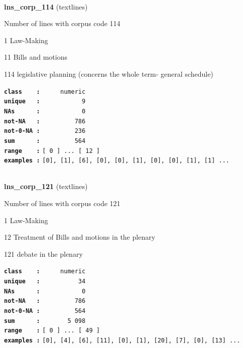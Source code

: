 \documentclass[]{article}
\begin{document}
~

\textbf{lns\_corp\_114} (textlines)

Number of lines with corpus code 114

1 Law-Making

11 Bills and motions

114 legislative planning (concerns the whole term- general schedule)

\textbf{\texttt{class\ \ \ \ :}} \texttt{~~~~~numeric}\\
\textbf{\texttt{unique\ \ \ :}} \texttt{~~~~~~~~~~~9}\\
\textbf{\texttt{NAs\ \ \ \ \ \ :}} \texttt{~~~~~~~~~~~0}\\
\textbf{\texttt{not-NA\ \ \ :}} \texttt{~~~~~~~~~786}\\
\textbf{\texttt{not-0-NA\ :}} \texttt{~~~~~~~~~236}\\
\textbf{\texttt{sum\ \ \ \ \ \ :}} \texttt{~~~~~~~~~564}\\
\textbf{\texttt{range\ \ \ \ :}}
\texttt{{[}\ 0\ {]}\ ...\ {[}\ 12\ {]}}\\
\textbf{\texttt{examples\ :}}
\texttt{{[}0{]},\ {[}1{]},\ {[}6{]},\ {[}0{]},\ {[}0{]},\ {[}1{]},\ {[}0{]},\ {[}0{]},\ {[}1{]},\ {[}1{]}\ ...}\\

~

\textbf{lns\_corp\_121} (textlines)

Number of lines with corpus code 121

1 Law-Making

12 Treatment of Bills and motions in the plenary

121 debate in the plenary

\textbf{\texttt{class\ \ \ \ :}} \texttt{~~~~~numeric}\\
\textbf{\texttt{unique\ \ \ :}} \texttt{~~~~~~~~~~34}\\
\textbf{\texttt{NAs\ \ \ \ \ \ :}} \texttt{~~~~~~~~~~~0}\\
\textbf{\texttt{not-NA\ \ \ :}} \texttt{~~~~~~~~~786}\\
\textbf{\texttt{not-0-NA\ :}} \texttt{~~~~~~~~~564}\\
\textbf{\texttt{sum\ \ \ \ \ \ :}} \texttt{~~~~~~~5~098}\\
\textbf{\texttt{range\ \ \ \ :}}
\texttt{{[}\ 0\ {]}\ ...\ {[}\ 49\ {]}}\\
\textbf{\texttt{examples\ :}}
\texttt{{[}0{]},\ {[}4{]},\ {[}6{]},\ {[}11{]},\ {[}0{]},\ {[}1{]},\ {[}20{]},\ {[}7{]},\ {[}0{]},\ {[}13{]}\ ...}\\
\end{document}
